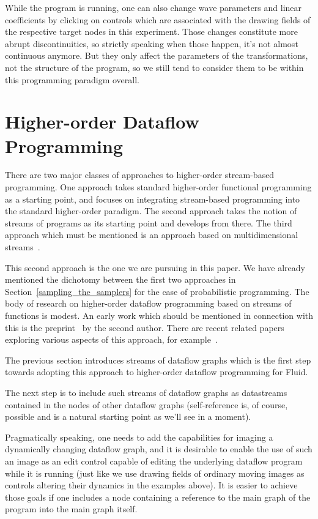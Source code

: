 \documentclass{llncs}
\begin{document}
While the program is running, one can also change wave parameters and linear coefficients by clicking on
controls which are associated with the drawing fields of the respective
target nodes in this experiment. Those changes constitute more abrupt discontinuities, 
so strictly speaking when those happen, it's not almost continuous anymore. 
But they only affect the parameters of the transformations, 
not the structure of the program, so we still tend to consider them to be within this programming paradigm overall.


\section{Higher-order Dataflow Programming}\label{higher}

There are two major classes of approaches to higher-order stream-based programming.
One approach takes standard higher-order functional programming as a starting point,
and focuses on integrating stream-based programming into the standard higher-order paradigm.
The second approach takes the notion of streams of programs as
its starting point and develops from there. The third approach which must be
mentioned is an approach based on multidimensional streams~\cite{WWadge}.

This second approach is the one we are
pursuing in this paper. We have already mentioned the dichotomy between the first two approaches in Section~\ref{sampling_the_samplers}
for the case of probabilistic programming. The body of research on higher-order dataflow
programming based on streams of functions is modest. An early work which should be mentioned
in connection with this is the preprint~\cite{SMatthews} by the second author. There are recent related
papers exploring various aspects of this approach, for example~\cite{NKrishnaswami}.

The previous section introduces streams of dataflow graphs which is the first step towards adopting this approach to higher-order dataflow programming
for Fluid.

The next step is to include such streams of dataflow graphs as datastreams contained in the nodes of other dataflow graphs (self-reference is, of course,
possible and is a natural starting point as we'll see in a moment). 

Pragmatically speaking, one needs to add the capabilities for imaging a dynamically changing dataflow graph, and it is desirable to
enable the use of such an image as an edit control capable of editing the underlying dataflow program while it is running
 (just like we use drawing fields of ordinary moving images as controls altering their dynamics in the examples above). It is
easier to achieve those goals if one includes a node containing a reference to the main graph of the program into the main graph
itself.
\end{document}

